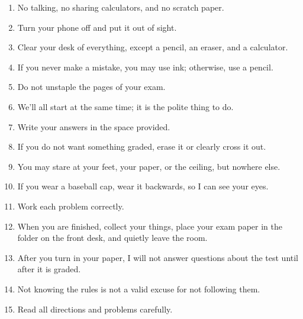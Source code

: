 \documentclass[12pt,fleqn,answers]{exam}
\begin{document}
\begin{tcolorbox}
\begin{minipage}{6.5in}
\begin{enumerate}
    \item No talking, no sharing calculators, and no scratch paper.
    \item  Turn your phone off and put it out of sight.
    \item  Clear your desk of everything, except a pencil, an eraser, and a calculator.
    \item If you never make a mistake, you may use ink; otherwise, use a pencil.
    \item Do not unstaple the pages of your exam.
    \item We'll all start at the same time; it is  the polite thing to do.
    \item Write your answers in the space provided. 
    \item If you do not want something graded, erase it or clearly cross it out. 
    \item You may stare at your feet, your paper, or the ceiling, but nowhere else. 
    \item If you wear a  baseball cap, wear it backwards, so I can see your eyes.
    \item Work each problem correctly.
    \item When you are finished, collect your things, place your exam paper in the folder on the front desk,
    and quietly leave the room.
    \item After you turn in your paper, I will not answer questions about the test until after it is graded.
    
    \item Not knowing the rules is not a valid excuse for not following them.
    
    \item Read all directions and problems carefully. 
    \end{enumerate} 
    \end{minipage} 
    
    \end{tcolorbox}

    \newpage
\end{document}
